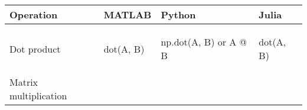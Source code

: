 \documentclass[10pt, landscape]{article}
\newenvironment{Shaded}{}{}
\newcommand{\OperatorTok}[1]{\textcolor[rgb]{0.40,0.40,0.40}{{#1}}}
\newcommand{\NormalTok}[1]{{#1}}
\begin{document}
\begin{multicols*}{2}
\begin{tabular}[ ]{@{}llll@{}}
\toprule
\begin{minipage}[b]{0.23\columnwidth}\raggedright\strut
Operation\strut
\end{minipage} & \begin{minipage}[b]{0.22\columnwidth}\raggedright\strut
MATLAB\strut
\end{minipage} & \begin{minipage}[b]{0.23\columnwidth}\raggedright\strut
Python\strut
\end{minipage} & \begin{minipage}[b]{0.20\columnwidth}\raggedright\strut
Julia\strut
\end{minipage}\tabularnewline
\midrule
\begin{minipage}[t]{0.23\columnwidth}\raggedright\strut
Dot product\strut
\end{minipage} & \begin{minipage}[t]{0.22\columnwidth}\raggedright\strut
\begin{Shaded}
\begin{Highlighting}[]
\NormalTok{dot(A, B)}
\end{Highlighting}
\end{Shaded}
\strut
\end{minipage} & \begin{minipage}[t]{0.23\columnwidth}\raggedright\strut
\begin{Shaded}
\begin{Highlighting}[]
\NormalTok{np.dot(A, B) }\OperatorTok{or} \NormalTok{A @ B}
\end{Highlighting}
\end{Shaded}
\strut
\end{minipage} & \begin{minipage}[t]{0.20\columnwidth}\raggedright\strut
\begin{Shaded}
\begin{Highlighting}[]
\NormalTok{dot(A, B)}
\end{Highlighting}
\end{Shaded}
\strut
\end{minipage}\tabularnewline
\begin{minipage}[t]{0.23\columnwidth}\raggedright\strut
Matrix multiplication\strut
\end{minipage} & \begin{minipage}[t]{0.22\columnwidth}\raggedright\strut
\begin{Shaded}
\begin{Highlighting}[]

\end{Highlighting}
\end{Shaded}
\end{minipage}
\end{tabular}
\end{multicols*}
\end{document}
